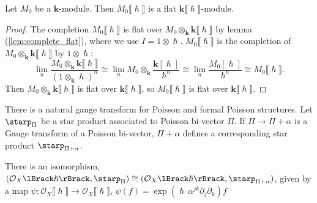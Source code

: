     \begin{lem}
    \label{lem:flat_kh_mod}
    Let \(M_0\) be a \(\mathbf{k}\)-module. Then \( M_0 \lBrack \hslash \rBrack\) is a flat \( \mathbf{k}\lBrack \hslash\rBrack\)-module.
    \end{lem}

    \begin{proof}
    The completion \(M_0 \lBrack \hslash \rBrack\) is flat over \(M_0 \otimes_{\mathbf{k}} \mathbf{k}\lBrack \hslash \rBrack \) by lemma (\ref{lem:complete_flat}), where we use \(I = 1 \otimes \hslash\).  \(M_0 \lBrack \hslash\rBrack\) is the completion of \(M_0 \otimes_{\mathbf{k}} \mathbf{k}\lBrack \hslash \rBrack\) by \( 1 \otimes \hslash\): 
    \[ \lim_n \frac{M_0  \otimes_{\mathbf{k}} \mathbf{k}\lBrack \hslash \rBrack }{\left(1 \otimes_{\mathbf{k}} \hslash\right)^n} \cong \lim_n M_0 \otimes_{\mathbf{k}}  \frac{\mathbf{k}[\hslash]}{\hslash^n} \cong \lim_n \frac{M_0[\hslash]}{\hslash^n} \cong M_0 \lBrack\hslash\rBrack.\] 
    Then \(M_0 \otimes_{\mathbf{k}} \mathbf{k} \lBrack \hslash \rBrack \) is flat over \( \mathbf{k} \lBrack \hslash\rBrack\), so \(M_0 \lBrack \hslash \rBrack\) is flat over \( \mathbf{k} \lBrack \hslash \rBrack\).
    \end{proof}
    
    
    


    
    
    There is a natural gauge transform for Poisson and formal Poisson structures. 
    Let \( \starp_{\Pi}\) be a star product associated to Poisson bi-vector \( \Pi\).
    If \( \Pi \rightarrow \Pi + \alpha\) is a Gauge transform of a Poisson bi-vector, \( \Pi + \alpha \) defines a corresponding star product \( \starp_{\Pi + \alpha}\).
    
    \begin{lem}
    There is an isomorphism, \( (\mathcal{O}_X \lBrack \hslash \rBrack,
    \starp_{\Pi} ) \cong ( \mathcal{O}_X \lBrack \hslash \rBrack, \starp_{\Pi + \alpha} )\), given by a map \(\psi : \mathcal{O}_X \lBrack \hslash \rBrack \rightarrow \mathcal{O}_X \lBrack \hslash \rBrack\),  \(\psi(f) = \exp( \hslash\, \alpha^{jk} \partial_j \partial_k ) f \)
    \end{lem}
    
